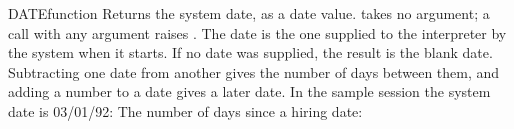 \begin{XbaseEntry}{DATE}{function}
Returns the system date, as a date value.
\Syntax
{}
\Usage
{} takes no argument; a call with any argument raises . The date is the one supplied to the interpreter by the system when it starts. If no date was supplied, the result is the blank date. Subtracting one date from another gives the number of days between them, and adding a number to a date gives a later date.
\Examples
In the sample session the system date is 03/01/92:
The number of days since a hiring date:
\end{XbaseEntry}

